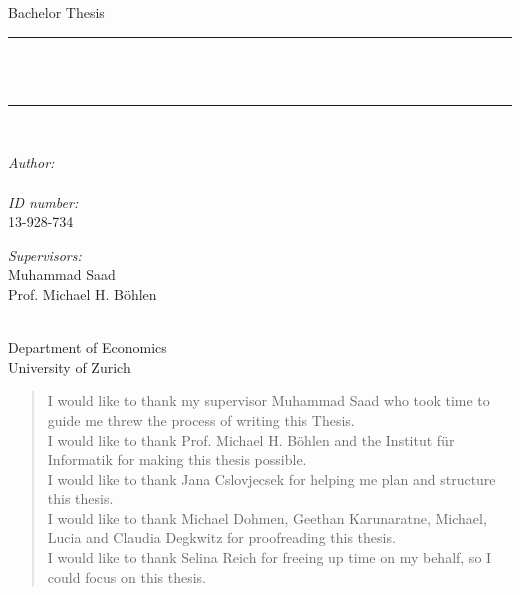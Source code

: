 \documentclass[12pt]{article}
\newenvironment{acknowledgements} {
	\renewcommand\abstractname{Acknowledgements}\begin{abstract}} {\end{abstract}
}
\begin{document}
	\makeatletter
	\begin{titlepage}
		\newcommand{\HRule}{\rule{\linewidth}{0.3mm}} %
		\center %
		\large{Bachelor Thesis}\\
		\HRule\\
		[0.5cm]
		{ \huge \bfseries \@title} \\%
		[0.5cm]
		\HRule\\
		[2cm]
		
		
		\begin{minipage}[t]{0.45\textwidth}
			\begin{flushleft} \large
				\emph{Author:}\\
				\@author \\
				\emph{ID number:} \\
				13-928-734
			\end{flushleft}
		\end{minipage}
		\begin{minipage}[t]{0.45\textwidth}
			\begin{flushright} \large
				\emph{Supervisors:}\\
				Muhammad Saad\\
				Prof. Michael H. Böhlen
			\end{flushright}
		\end{minipage}\\[0.15cm]
		
		
		\vfill
		{\large
			Department of Economics\\
			University of Zurich\\
			[0.5cm]
			\@date}
		
		\hfill
	\end{titlepage}
	\makeatother
	
	
	
	\begin{acknowledgements}
		
		I would like to thank my supervisor Muhammad Saad who took time to guide me threw the process of writing this Thesis.\\
		
		I would like to thank Prof. Michael H. Böhlen and the Institut für Informatik for making this thesis possible. \\
		
		I would like to thank Jana Cslovjecsek for helping me plan and structure this thesis. \\
		
		I would like to thank Michael Dohmen, Geethan Karunaratne, Michael, Lucia and Claudia Degkwitz for proofreading this thesis. \\
		
		I would like to thank Selina Reich for freeing up time on my behalf, so I could focus on this thesis.
		
	\end{acknowledgements}
	
\end{document}
